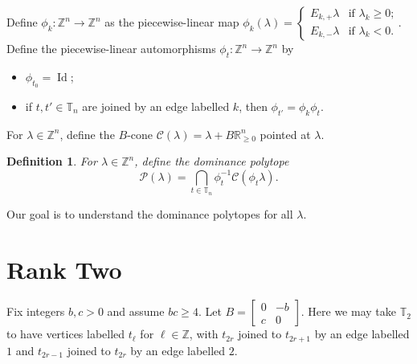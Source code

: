 \documentclass{amsart}
\newtheorem{definition}[theorem]{Definition}
\numberwithin{theorem}{section}
\newcommand{\cC}{\mathcal{C}}
\newcommand{\cP}{\mathcal{P}}
\newcommand{\RR}{\mathbb{R}}
\newcommand{\TT}{\mathbb{T}}
\newcommand{\ZZ}{\mathbb{Z}}
\newcommand{\Id}{\operatorname{Id}}
\begin{document}
  Define $\phi_k:\ZZ^n\to\ZZ^n$ as the piecewise-linear map $\phi_k(\lambda)=\begin{cases} E_{k,+}\lambda & \text{if $\lambda_k\ge0$;}\\ E_{k,-}\lambda & \text{if $\lambda_k<0$.} \end{cases}$.
  Define the piecewise-linear automorphisms $\phi_t:\ZZ^n\to\ZZ^n$ by
  \begin{itemize}
    \item $\phi_{t_0}=\Id$;
    \item if $t,t'\in\TT_n$ are joined by an edge labelled $k$, then $\phi_{t'}=\phi_k \phi_t$.
  \end{itemize}
  For $\lambda\in\ZZ^n$, define the $B$-cone $\cC(\lambda)=\lambda+B\RR_{\ge0}^n$ pointed at $\lambda$.
  \begin{definition}
    For $\lambda\in\ZZ^n$, define the \emph{dominance polytope} 
    \[ \cP(\lambda) = \bigcap_{t\in\TT_n} \phi_t^{-1} \cC(\phi_t \lambda). \]
  \end{definition}
  Our goal is to understand the dominance polytopes for all $\lambda$.

  \section{Rank Two}
  Fix integers $b,c>0$ and assume $bc\ge4$.
  Let $B=\left[ \begin{array}{cc} 0 & -b \\ c & 0 \end{array} \right]$.
  Here we may take $\TT_2$ to have vertices labelled $t_\ell$ for $\ell\in\ZZ$, with $t_{2r}$ joined to $t_{2r+1}$ by an edge labelled $1$ and $t_{2r-1}$ joined to $t_{2r}$ by an edge labelled $2$.
\end{document}
